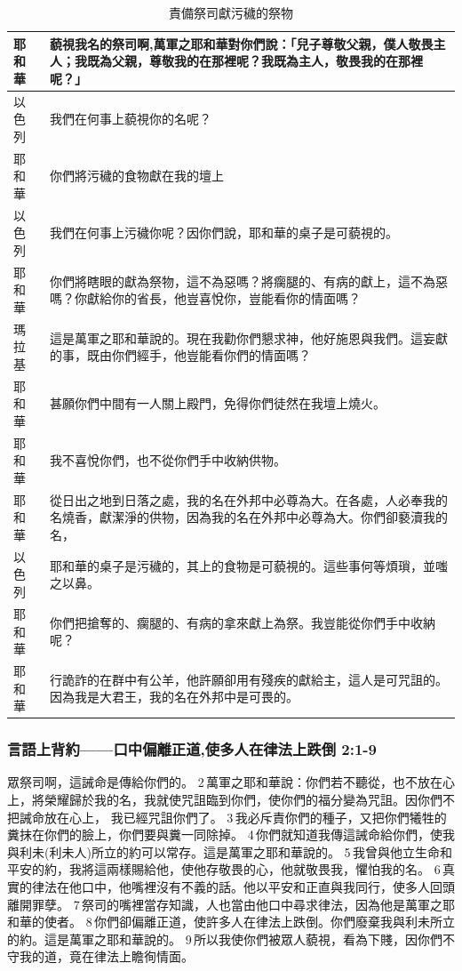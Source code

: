 \begin{table}[!hbp]
\centering 
\begin{tabular}{|p{1.2cm}|p{14cm}|}
\hline
\hline
耶和華                          &藐視我名的祭司啊,萬軍之耶和華對你們說：「兒子尊敬父親，僕人敬畏主人；我既為父親，尊敬我的在那裡呢？我既為主人，敬畏我的在那裡呢？」\\\hline
以色列                          &我們在何事上藐視你的名呢？\\\hline
耶和華 &你們將污穢的食物獻在我的壇上\\ \hline
以色列  &我們在何事上污穢你呢？因你們說，耶和華的桌子是可藐視的。\\ \hline
耶和華 &你們將瞎眼的獻為祭物，這不為惡嗎？將瘸腿的、有病的獻上，這不為惡嗎？你獻給你的省長，他豈喜悅你，豈能看你的情面嗎？\\ \hline
瑪拉基 &這是萬軍之耶和華說的。現在我勸你們懇求神，他好施恩與我們。這妄獻的事，既由你們經手，他豈能看你們的情面嗎？\\ \hline
耶和華 &甚願你們中間有一人關上殿門，免得你們徒然在我壇上燒火。\\ \hline
耶和華 &我不喜悅你們，也不從你們手中收納供物。 \\ \hline
耶和華 & 從日出之地到日落之處，我的名在外邦中必尊為大。在各處，人必奉我的名燒香，獻潔淨的供物，因為我的名在外邦中必尊為大。你們卻褻瀆我的名， \\ \hline
以色列  &耶和華的桌子是污穢的，其上的食物是可藐視的。這些事何等煩瑣，並嗤之以鼻。 \\ \hline
耶和華 &你們把搶奪的、瘸腿的、有病的拿來獻上為祭。我豈能從你們手中收納呢？ \\ \hline
耶和華 &行詭詐的在群中有公羊，他許願卻用有殘疾的獻給主，這人是可咒詛的。因為我是大君王，我的名在外邦中是可畏的。 \\ \hline
\end{tabular}
\caption{責備祭司獻污穢的祭物}
\end{table}


\subsubsection{言語上背約——口中偏離正道,使多人在律法上跌倒 2:1-9}
眾祭司啊，這誡命是傳給你們的。 2 萬軍之耶和華說：你們若不聽從，也不放在心上，將榮耀歸於我的名，我就使咒詛臨到你們，使你們的福分變為咒詛。因你們不把誡命放在心上，
我已經咒詛你們了。 3 我必斥責你們的種子，又把你們犧牲的糞抹在你們的臉上，你們要與糞一同除掉。 4 你們就知道我傳這誡命給你們，使我與利未(利未人)所立的約可以常存。這是萬軍之耶和華說的。 
5 我曾與他立生命和平安的約，我將這兩樣賜給他，使他存敬畏的心，他就敬畏我，懼怕我的名。 6 真實的律法在他口中，他嘴裡沒有不義的話。他以平安和正直與我同行，使多人回頭離開罪孽。 7 祭司的嘴裡當存知識，人也當由他口中尋求律法，因為他是萬軍之耶和華的使者。 
8 你們卻偏離正道，使許多人在律法上跌倒。你們廢棄我與利未所立的約。這是萬軍之耶和華說的。 9 所以我使你們被眾人藐視，看為下賤，因你們不守我的道，竟在律法上瞻徇情面。



